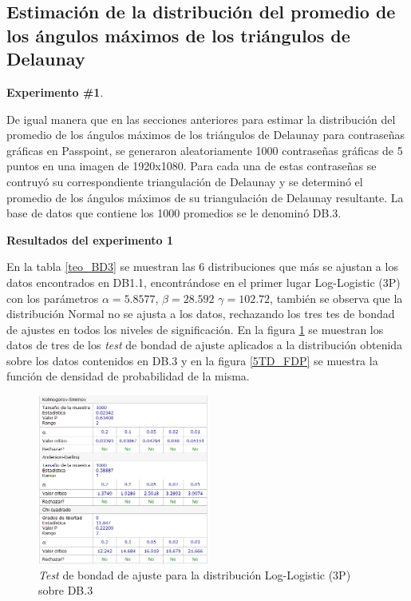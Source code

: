 \documentclass[12pt]{report}
\begin{document}
\subsection{Estimación de la distribución del promedio de los ángulos máximos de los triángulos de Delaunay }
\textbf{Experimento \#1}.

De igual manera que en las secciones anteriores para estimar la distribución del promedio de los ángulos máximos de los triángulos de Delaunay para contraseñas gráficas en Passpoint, se generaron aleatoriamente 1000 contraseñas gráficas de 5 puntos en una imagen de 1920x1080. Para cada una de estas contraseñas se  contruyó  su correspondiente triangulación  de Delaunay  y se  determinó el promedio  de los ángulos máximos de su triangulación de Delaunay resultante. La base de datos que contiene los 1000 promedios se le denominó DB.3.


\textbf{Resultados del experimento 1}

En la tabla \ref{teo_BD3}  se muestran las 6 distribuciones que más se ajustan a los datos encontrados en DB1.1, encontrándose en el primer lugar Log-Logistic (3P) con los parámetros $\alpha=5.8577$, $\beta=28.592$ $\gamma=102.72$, también se observa que la distribución Normal  no se ajusta a los datos, rechazando los tres tes de bondad de ajustes en todos los niveles de significación. En la figura \ref{5TD_BONDAD} se  muestran los datos de tres de los \textit{test} de bondad de ajuste aplicados a la distribución obtenida sobre los datos contenidos en DB.3 y en la figura \ref{5TD_FDP} se muestra la función de densidad de probabilidad de la misma. 
\begin{figure}[ht]
	\centering
	
	\includegraphics[width=0.5\textwidth]{5td_bondad.png}
	\caption{\textit{Test} de bondad de ajuste para la distribución Log-Logistic (3P) sobre DB.3}
	\label{5TD_BONDAD}
\end{figure}
         
\end{document}
